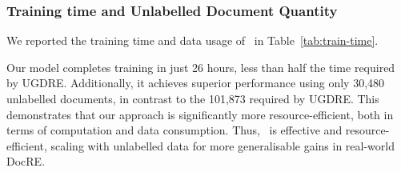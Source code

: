 \subsubsection{Training time and Unlabelled Document Quantity}
We reported the training time and data usage of \model\ in Table~\ref{tab:train-time}.
\begin{table}[!ht]
    \centering
    \caption{Comparison of Training Time and Unlabelled Data Usage Between \model\ and UGDRE.}
    \label{tab:train-time}
    \vspace{-3mm}
\end{table}

Our model completes training in just 26 hours, less than half the time required by UGDRE. Additionally, it achieves superior performance using only 30,480 unlabelled documents, in contrast to the 101,873 required by UGDRE. This demonstrates that our approach is significantly more resource-efficient, both in terms of computation and data consumption. Thus, \model\ is effective and resource-efficient, scaling with unlabelled data for more generalisable gains in real-world DocRE.


